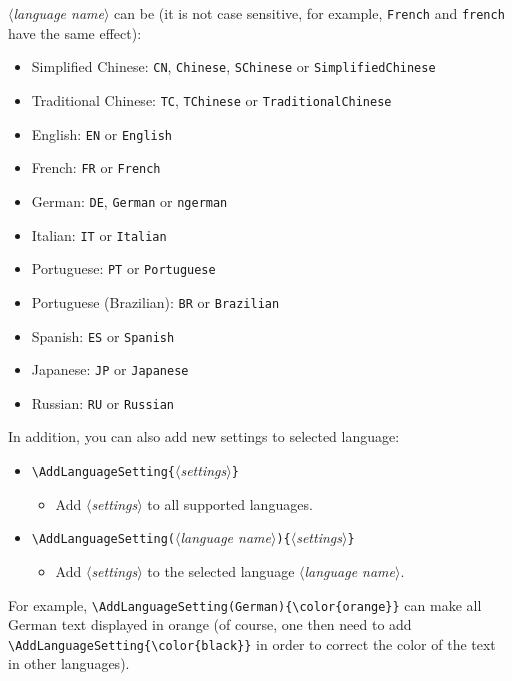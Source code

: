 \documentclass[allowbf,regionalref,puretext]{lebhart}
\providecommand{\meta}[1]{$\langle${\normalfont\itshape#1}$\rangle$}
\begin{document}
\meta{language name} can be (it is not case sensitive, for example, \texttt{French} and \texttt{french} have the same effect):
\begin{itemize}
    \item Simplified Chinese: \texttt{CN}, \texttt{Chinese}, \texttt{SChinese} or \texttt{SimplifiedChinese}
    \item Traditional Chinese: \texttt{TC}, \texttt{TChinese} or \texttt{TraditionalChinese}
    \item English: \texttt{EN} or \texttt{English}
    \item French: \texttt{FR} or \texttt{French}
    \item German: \texttt{DE}, \texttt{German} or \texttt{ngerman}
    \item Italian: \texttt{IT} or \texttt{Italian}
    \item Portuguese: \texttt{PT} or \texttt{Portuguese}
    \item Portuguese (Brazilian): \texttt{BR} or \texttt{Brazilian}
    \item Spanish: \texttt{ES} or \texttt{Spanish}
    \item Japanese: \texttt{JP} or \texttt{Japanese}
    \item Russian: \texttt{RU} or \texttt{Russian}
\end{itemize}

In addition, you can also add new settings to selected language:
\begin{itemize}
    \item \lstinline|\AddLanguageSetting{|\meta{settings}\lstinline|}|
    \begin{itemize}
        \item Add \meta{settings} to all supported languages.
    \end{itemize}
    \item \lstinline|\AddLanguageSetting(|\meta{language name}\lstinline|){|\meta{settings}\lstinline|}|
    \begin{itemize}
        \item Add \meta{settings} to the selected language \meta{language name}.
    \end{itemize}
\end{itemize}
For example, \lstinline|\AddLanguageSetting(German){\color{orange}}| can make all German text displayed in orange (of course, one then need to add \lstinline|\AddLanguageSetting{\color{black}}| in order to correct the color of the text in other languages).
\end{document}
